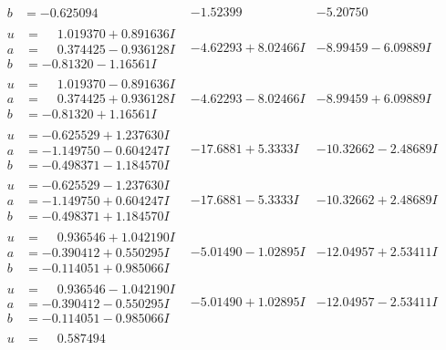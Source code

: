 \documentclass[1p]{elsarticle_modified}
\theoremstyle{definition}
\begin{document}
$$\begin{array}{c|c|c}
\begin{aligned}
b &= -0.625094\phantom{ +0.000000I}\end{aligned}
 & -1.52399\phantom{ +0.000000I} & -5.20750\phantom{ +0.000000I} \\ \hline\begin{aligned}
u &= \phantom{-}1.019370 + 0.891636 I \\
a &= \phantom{-}0.374425 - 0.936128 I \\
b &= -0.81320 - 1.16561 I\end{aligned}
 & -4.62293 + 8.02466 I & -8.99459 - 6.09889 I \\ \hline\begin{aligned}
u &= \phantom{-}1.019370 - 0.891636 I \\
a &= \phantom{-}0.374425 + 0.936128 I \\
b &= -0.81320 + 1.16561 I\end{aligned}
 & -4.62293 - 8.02466 I & -8.99459 + 6.09889 I \\ \hline\begin{aligned}
u &= -0.625529 + 1.237630 I \\
a &= -1.149750 - 0.604247 I \\
b &= -0.498371 - 1.184570 I\end{aligned}
 & -17.6881 + 5.3333 I & -10.32662 - 2.48689 I \\ \hline\begin{aligned}
u &= -0.625529 - 1.237630 I \\
a &= -1.149750 + 0.604247 I \\
b &= -0.498371 + 1.184570 I\end{aligned}
 & -17.6881 - 5.3333 I & -10.32662 + 2.48689 I \\ \hline\begin{aligned}
u &= \phantom{-}0.936546 + 1.042190 I \\
a &= -0.390412 + 0.550295 I \\
b &= -0.114051 + 0.985066 I\end{aligned}
 & -5.01490 - 1.02895 I & -12.04957 + 2.53411 I \\ \hline\begin{aligned}
u &= \phantom{-}0.936546 - 1.042190 I \\
a &= -0.390412 - 0.550295 I \\
b &= -0.114051 - 0.985066 I\end{aligned}
 & -5.01490 + 1.02895 I & -12.04957 - 2.53411 I \\ \hline\begin{aligned}
u &= \phantom{-}0.587494\phantom{ +0.000000I} \\

\end{aligned}
\end{array}$$
\end{document}

